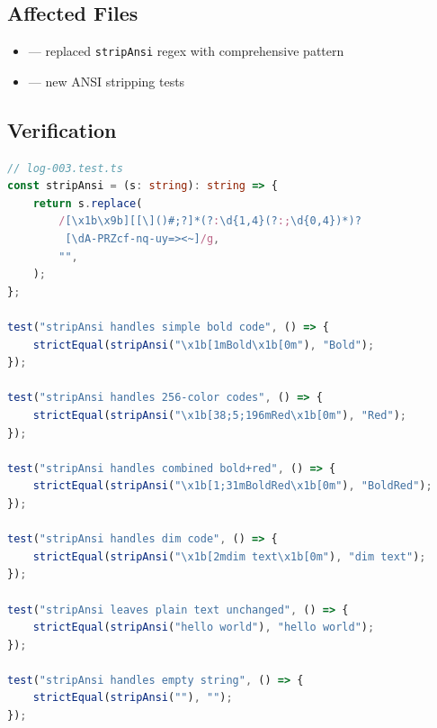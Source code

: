 \subsection*{Affected Files}
\begin{itemize}
    \item {} --- replaced \texttt{stripAnsi} regex with comprehensive pattern
    \item {} --- new ANSI stripping tests
\end{itemize}

\subsection*{Verification}
\begin{lstlisting}[language=TypeScript]
// log-003.test.ts
const stripAnsi = (s: string): string => {
    return s.replace(
        /[\x1b\x9b][[\]()#;?]*(?:\d{1,4}(?:;\d{0,4})*)?
         [\dA-PRZcf-nq-uy=><~]/g,
        "",
    );
};

test("stripAnsi handles simple bold code", () => {
    strictEqual(stripAnsi("\x1b[1mBold\x1b[0m"), "Bold");
});

test("stripAnsi handles 256-color codes", () => {
    strictEqual(stripAnsi("\x1b[38;5;196mRed\x1b[0m"), "Red");
});

test("stripAnsi handles combined bold+red", () => {
    strictEqual(stripAnsi("\x1b[1;31mBoldRed\x1b[0m"), "BoldRed");
});

test("stripAnsi handles dim code", () => {
    strictEqual(stripAnsi("\x1b[2mdim text\x1b[0m"), "dim text");
});

test("stripAnsi leaves plain text unchanged", () => {
    strictEqual(stripAnsi("hello world"), "hello world");
});

test("stripAnsi handles empty string", () => {
    strictEqual(stripAnsi(""), "");
});
\end{lstlisting}
